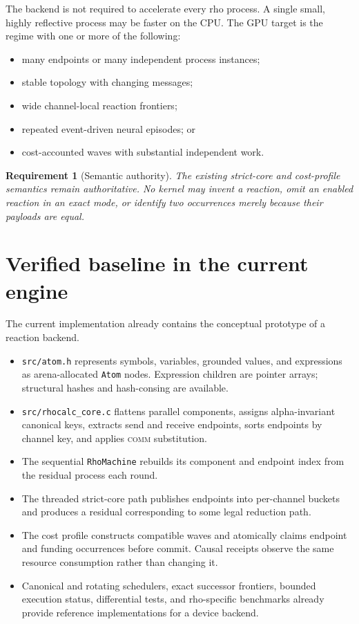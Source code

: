 \documentclass[11pt]{article}
\newtheorem{requirement}{Requirement}[section]
\newcommand{\COMM}{\textsc{comm}}
\newcommand{\code}[1]{\texttt{#1}}
\newcommand{\codepath}[1]{\nolinkurl{#1}}
\begin{document}
The backend is not required to accelerate every rho process.  A single small,
highly reflective process may be faster on the CPU.  The GPU target is the
regime with one or more of the following:
\begin{itemize}
\item many endpoints or many independent process instances;
\item stable topology with changing messages;
\item wide channel-local reaction frontiers;
\item repeated event-driven neural episodes; or
\item cost-accounted waves with substantial independent work.
\end{itemize}

\begin{requirement}[Semantic authority]
The existing strict-core and cost-profile semantics remain authoritative.
No kernel may invent a reaction, omit an enabled reaction in an exact mode,
or identify two occurrences merely because their payloads are equal.
\end{requirement}

\section{Verified baseline in the current engine}

The current implementation already contains the conceptual prototype of a
reaction backend.

\begin{itemize}
\item \codepath{src/atom.h} represents symbols, variables, grounded values,
  and expressions as arena-allocated \code{Atom} nodes.  Expression children
  are pointer arrays; structural hashes and hash-consing are available.
\item \codepath{src/rhocalc_core.c} flattens parallel components, assigns
  alpha-invariant canonical keys, extracts send and receive endpoints, sorts
  endpoints by channel key, and applies \COMM{} substitution.
\item The sequential \code{RhoMachine} rebuilds its component and endpoint
  index from the residual process each round.
\item The threaded strict-core path publishes endpoints into per-channel
  buckets and produces a residual corresponding to some legal reduction
  path.
\item The cost profile constructs compatible waves and atomically claims
  endpoint and funding occurrences before commit.  Causal receipts observe
  the same resource consumption rather than changing it.
\item Canonical and rotating schedulers, exact successor frontiers, bounded
  execution status, differential tests, and rho-specific benchmarks already
  provide reference implementations for a device backend.
\end{itemize}
\end{document}
